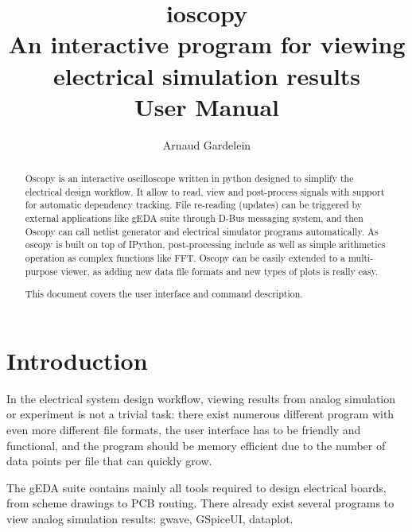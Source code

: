 \documentclass[a4paper,11pt]{article}
\title{{\sc ioscopy}\\An interactive program for viewing electrical simulation results\\User Manual}
\author{Arnaud Gardelein}
\begin{document}
\sf
\maketitle
\begin{abstract}

Oscopy is an interactive oscilloscope written in python designed to simplify the electrical design workflow.
It allow to read, view and post-process signals with support for automatic dependency tracking.
File re-reading (updates) can be triggered by external applications like gEDA suite through D-Bus messaging system, and then Oscopy can call netlist generator and electrical simulator programs automatically.
As oscopy is built on top of IPython, post-processing include as well as simple arithmetics operation as complex functions like FFT.
Oscopy can be easily extended to a multi-purpose viewer, as adding new data file formats and new types of plots is really easy.


This document covers the user interface and command description.
\end{abstract}

\section{Introduction}
\label{sec:intro}
In the electrical system design workflow, viewing results from analog simulation or experi\-ment is not a trivial task: there exist numerous different program with even more different file formats, the user interface has to be friendly and functional, and the program should be memory efficient due to the number of data points per file that can quickly grow.

The gEDA suite contains mainly all tools required to design electrical boards, from scheme drawings to PCB routing.
There already exist several programs to view analog simulation results: gwave, GSpiceUI, dataplot.
\end{document}
